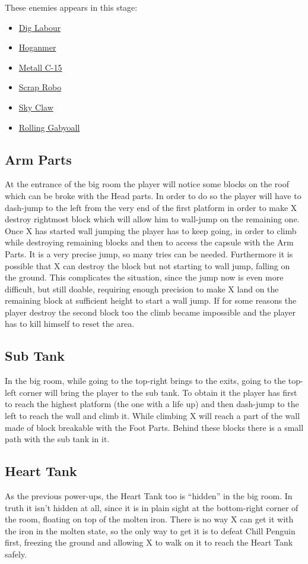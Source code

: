 These enemies appears in this stage\cite{wiki:Factory}:
\begin{itemize}
	\item \hyperlink{enem:Dig_Labour}{Dig Labour} 
	\item \hyperlink{enem:Hoganmer}{Hoganmer}
	\item \hyperlink{enem:Metall_C-15}{Metall C-15}
	\item \hyperlink{enem:Scrap_Robo}{Scrap Robo}
	\item \hyperlink{enem:Sky_Claw}{Sky Claw}
	\item \hyperlink{enem:Rolling_Gabyoall}{Rolling Gabyoall}
\end{itemize}

\subsection{Arm Parts}
At the entrance of the big room the player will notice some blocks on the roof which can be broke with the Head parts. In order to do so the player will have to dash-jump to the left from the very end of the first platform in order to make X destroy rightmost block which will allow him to wall-jump on the remaining one. Once X has started wall jumping the player has to keep going, in order to climb while destroying remaining blocks and then to access the capsule with the Arm Parts. It is a very precise jump, so many tries can be needed. Furthermore it is possible that X can destroy the block but not starting to wall jump, falling on the ground. This complicates the situation, since the jump now is even more difficult, but still doable, requiring enough precision to make X land on the remaining block at sufficient height to start a wall jump. If for some reasons the player destroy the second block too the climb became impossible and the player has to kill himself to reset the area.

\subsection{Sub Tank}
In the big room, while going to the top-right brings to the exits, going to the top-left corner will bring the player to the sub tank. To obtain it the player has first to reach the highest platform (the one with a life up) and then dash-jump to the left to reach the wall and climb it. While climbing X will reach a part of the wall made of block breakable with the Foot Parts. Behind these blocks there is a small path with the sub tank in it.
\subsection{Heart Tank}
As the previous power-ups, the Heart Tank too is ``hidden'' in the big room. In truth it isn't hidden at all, since it is in plain sight at the bottom-right corner of the room, floating on top of the molten iron. There is no way X can get it with the iron in the molten state, so the only way to get it is to defeat Chill Penguin first, freezing the ground and allowing X to walk on it to reach the Heart Tank safely.

